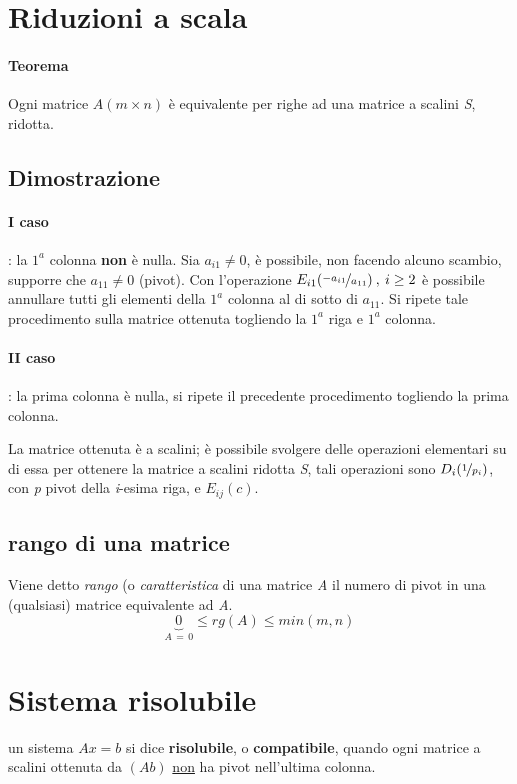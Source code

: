 	\section{Riduzioni a scala}
		\paragraph{Teorema} Ogni matrice $ A (m \times n) $ è equivalente per righe ad una matrice a scalini \textit{S}, ridotta.
		
		\begin{GrayBox}
			\subsection{Dimostrazione}
			\paragraph{I caso}: la $1^a$ colonna \textbf{non} è nulla.
			Sia $ a_{i1} \neq 0 $, è possibile, non facendo alcuno scambio, supporre che $ a_{11} \neq 0 $ (pivot).
			Con l'operazione $ E_{i1}(\nicefrac{-a_{i1}}{a_{11}}) \: , \: i \geq 2 $ è possibile annullare tutti gli elementi della $1^a$ colonna al di sotto di $a_{11}$.
			Si ripete tale procedimento sulla matrice ottenuta togliendo la $1^a$ riga e $1^a$ colonna.
			
			\paragraph{II caso}: la prima colonna è nulla, si ripete il precedente procedimento togliendo la prima colonna.
			
			La matrice ottenuta è a scalini; è possibile svolgere delle operazioni elementari su di essa per ottenere la matrice a scalini ridotta \textit{S}, tali operazioni sono $ D_i(\nicefrac{1}{p_i}) $, con \textit{p} pivot della \textit{i}-esima riga, e $ E_{ij}(c) $.
			
		\end{GrayBox}
		
		\subsection{rango di una matrice}
			Viene detto \emph{rango} (o \emph{caratteristica} di una matrice \textit{A} il numero di pivot in una (qualsiasi) matrice equivalente ad \textit{A}.
			$$ \underbrace{0}_{ A \, = \, 0 } \leq rg(A) \leq min(m, n) $$
		
	\section{Sistema risolubile}
		un sistema $ Ax = b $ si dice \textbf{risolubile}, o \textbf{compatibile}, quando ogni matrice a scalini ottenuta da $(Ab)$ \underline{non} ha pivot nell'ultima colonna.
		

